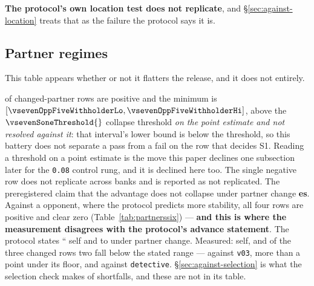 \textbf{The protocol's own location test does not replicate}, and \S\ref{sec:against-location} treats
that as the failure the protocol says it is.

\subsection{Partner regimes}
\label{sec:results-partners}

This table appears whether or not it flatters the release, and it does not entirely.

\begin{table}[t]\centering
\caption{The partner-regime table against a \vfive{} opponent. Team A is [arm, P, P]; team B is three
copies of the opponent. Every delta carries an interval; the phase-5 results document compresses these
out of its own table and they are restored here (\S\ref{sec:corrections-intervals}).}
\label{tab:partners}
{\small}
\end{table}

\vsevenSonePositive{} of \vsevenSoneRows{} changed-partner rows are positive and the minimum is
\vsevenSoneMin{} $[\vsevenOppFiveWithholderLo, \vsevenOppFiveWithholderHi]$, above the
$\vsevenSoneThreshold{}$ collapse threshold \emph{on the point estimate and not resolved against
it}: that interval's lower bound is below the threshold, so this battery does not separate a pass
from a fail on the row that decides S1. Reading a threshold on a point estimate is the move this
paper declines one subsection later for the \texttt{0.08} control rung, and it is declined here
too. The single negative row
does not replicate across banks and is reported as not replicated. The preregistered claim that the
advantage does not collapse under partner change \textbf{\vsevenSoneVerdict{}es}. Against a \vsix{} opponent, where the protocol predicts more stability, all four rows are positive
and clear zero (Table~\ref{tab:partnerssix}) --- \textbf{and this is where the measurement disagrees
with the protocol's advance statement}. The protocol states ``\vsevenTrainOppSixSelf{} self and
\vsevenTrainOppSixLo{} to \vsevenTrainOppSixHi{} under partner change. Measured:
\vsevenOppSixItself{} self, and of the three changed rows two fall below the stated range ---
\vsevenOppSixVthree{} against \texttt{v03}, more than a point under its floor, and
\vsevenOppSixDetective{} against \texttt{detective}. \S\ref{sec:against-selection} is what the
selection check makes of shortfalls, and these are not in its table.

